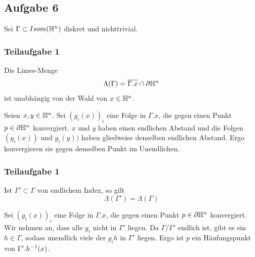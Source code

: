 \documentclass{book}
\begin{document}
\subsection{Aufgabe 6}
Sei $\Gamma \subset Isom(\mathbb{H}^n)$ diskret und nichttrivial.
\subsubsection{Teilaufgabe 1}
Die Limes-Menge
\[ \Lambda(\Gamma) = \overline{\Gamma.x} \cap \partial \mathbb{H}^n \]
ist unabhängig von der Wahl von $x \in \mathbb{H}^n$.
\begin{Beweis}{}
	Seien $x,y \in \mathbb{H}^n$. Sei $(g_i(x))_i$ eine Folge in $\Gamma.x$, die gegen einen Punkt $p \in \partial \mathbb{H}^n$ konvergiert. $x$ und $y$ haben einen endlichen Abstand und die Folgen $(g_i(x))$ und $g_i(y))$ haben gliedweise denselben endlichen Abstand. Ergo konvergieren sie gegen denselben Punkt im Unendlichen.
\end{Beweis}

\subsubsection{Teilaufgabe 1}
Ist $\Gamma' \subset \Gamma$ von endlichem Index, so gilt
\[ \Lambda(\Gamma') = \Lambda(\Gamma) \]
\begin{Beweis}{}
	Sei $(g_i(x))_i$ eine Folge in $\Gamma.x$, die gegen einen Punkt $p \in \partial \mathbb{H}^n$ konvergiert. Wir nehmen an, dass alle $g_i$ nicht in $\Gamma'$ liegen. Da $\Gamma / \Gamma'$ endlich ist, gibt es ein $h \in \Gamma$, sodass unendlich viele der $g_ih$ in $\Gamma'$ liegen. Ergo ist $p$ ein Häufungspunkt von $\Gamma'.h^{-1}(x)$.
\end{Beweis}


\printindex
\end{document}
